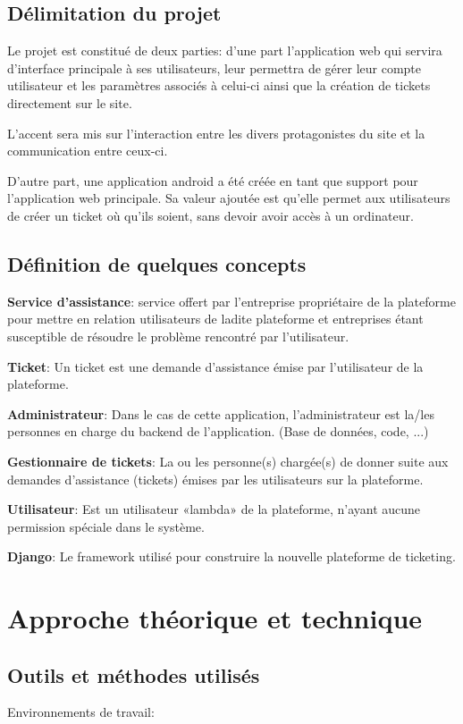 \documentclass[12pt,table,a4paper]{report}
\begin{document}
\section{Délimitation du projet}
Le projet est constitué de deux parties: d'une part l'application web qui servira d'interface principale à ses utilisateurs, leur permettra de gérer leur compte utilisateur et les paramètres associés à celui-ci ainsi que la création de tickets directement sur le site.

L'accent sera mis sur l'interaction entre les divers protagonistes du site et la communication entre ceux-ci.

D'autre part, une application android a été créée en tant que support pour l'application web principale. Sa valeur ajoutée est qu'elle permet aux utilisateurs de créer un ticket où qu'ils soient, sans devoir avoir accès à un ordinateur.


\section{Définition de quelques concepts}
\textbf{Service d'assistance}: service offert par l'entreprise propriétaire de la plateforme pour mettre en relation utilisateurs de ladite plateforme et entreprises étant susceptible de résoudre le problème rencontré par l'utilisateur.

\textbf{Ticket}: Un ticket est une demande d'assistance émise par l'utilisateur de la plateforme.

\textbf{Administrateur}: Dans le cas de cette application, l'administrateur est la/les personnes en charge du backend de l'application. (Base de données, code, ...)

\textbf{Gestionnaire de tickets}: La ou les personne(s) chargée(s) de donner suite aux demandes d'assistance (tickets) émises par les utilisateurs sur la plateforme.

\textbf{Utilisateur}: Est un utilisateur «lambda» de la plateforme, n'ayant aucune permission spéciale dans le système.

\textbf{Django}: Le framework utilisé pour construire la nouvelle plateforme de ticketing.


\chapter{Approche théorique et technique}
\section{Outils et méthodes utilisés}
Environnements de travail:
\end{document}
